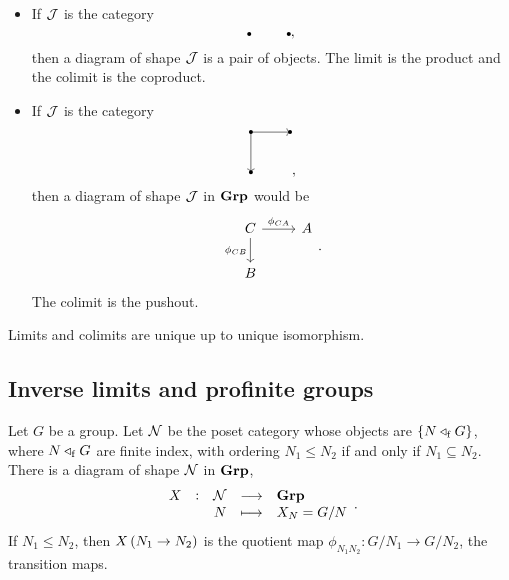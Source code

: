 \begin{example}
\hfill
\begin{itemize}
\item If $ \mathcal{J} $ is the category
$$
\begin{tikzpicture}
\fill (0, 0) circle (0.05);
\fill (1, 0) circle (0.05);
\end{tikzpicture},
$$
then a diagram of shape $ \mathcal{J} $ is a pair of objects. The limit is the product and the colimit is the coproduct.
\item If $ \mathcal{J} $ is the category
$$
\begin{tikzpicture}
\fill (0, 0) circle (0.05);
\fill (1, 0) circle (0.05);
\fill (0, -1) circle (0.05);
\draw [->] (0, 0) to (1, 0);
\draw [->] (0, 0) to (0, -1);
\end{tikzpicture},
$$
then a diagram of shape $ \mathcal{J} $ in $ \textbf{Grp} $ would be
$$
\begin{tikzcd}
C \arrow{r}{\phi_{CA}} \arrow{d}[swap]{\phi_{CB}} & A \\
B &
\end{tikzcd}.
$$
The colimit is the pushout.
\end{itemize}
\end{example}

\begin{proposition}
Limits and colimits are unique up to unique isomorphism.
\end{proposition}

\pagebreak

\subsection{Inverse limits and profinite groups}

Let $ G $ be a group. Let $ \mathcal{N} $ be the poset category whose objects are $ \cbr{N \triangleleft_\f G} $, where $ N \triangleleft_{\mathrm{f}} G $ are finite index, with ordering $ N_1 \le N_2 $ if and only if $ N_1 \subseteq N_2 $. There is a diagram of shape $ \mathcal{N} $ in $ \textbf{Grp} $,
$$ \function[X]{\NNN}{\Grp}{N}{X_N = G / N}. $$
If $ N_1 \le N_2 $, then $ X\br{N_1 \to N_2} $ is the quotient map $ \phi_{N_1N_2} : G / N_1 \to G / N_2 $, the transition maps.

